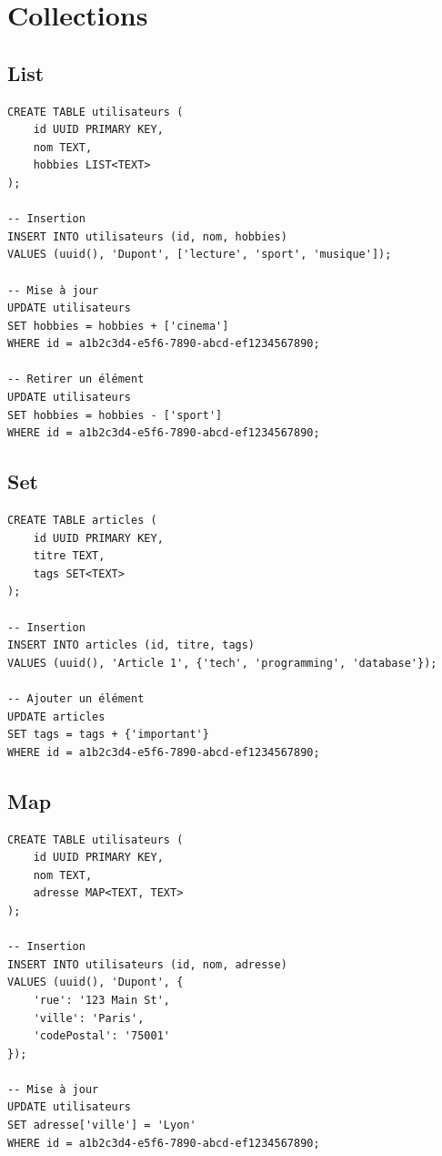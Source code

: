 \documentclass[11pt,a4paper]{article}
\begin{document}
\newpage

\section{Collections}

\subsection{List}

\begin{lstlisting}
CREATE TABLE utilisateurs (
    id UUID PRIMARY KEY,
    nom TEXT,
    hobbies LIST<TEXT>
);

-- Insertion
INSERT INTO utilisateurs (id, nom, hobbies)
VALUES (uuid(), 'Dupont', ['lecture', 'sport', 'musique']);

-- Mise à jour
UPDATE utilisateurs
SET hobbies = hobbies + ['cinema']
WHERE id = a1b2c3d4-e5f6-7890-abcd-ef1234567890;

-- Retirer un élément
UPDATE utilisateurs
SET hobbies = hobbies - ['sport']
WHERE id = a1b2c3d4-e5f6-7890-abcd-ef1234567890;
\end{lstlisting}

\subsection{Set}

\begin{lstlisting}
CREATE TABLE articles (
    id UUID PRIMARY KEY,
    titre TEXT,
    tags SET<TEXT>
);

-- Insertion
INSERT INTO articles (id, titre, tags)
VALUES (uuid(), 'Article 1', {'tech', 'programming', 'database'});

-- Ajouter un élément
UPDATE articles
SET tags = tags + {'important'}
WHERE id = a1b2c3d4-e5f6-7890-abcd-ef1234567890;
\end{lstlisting}

\subsection{Map}

\begin{lstlisting}
CREATE TABLE utilisateurs (
    id UUID PRIMARY KEY,
    nom TEXT,
    adresse MAP<TEXT, TEXT>
);

-- Insertion
INSERT INTO utilisateurs (id, nom, adresse)
VALUES (uuid(), 'Dupont', {
    'rue': '123 Main St',
    'ville': 'Paris',
    'codePostal': '75001'
});

-- Mise à jour
UPDATE utilisateurs
SET adresse['ville'] = 'Lyon'
WHERE id = a1b2c3d4-e5f6-7890-abcd-ef1234567890;
\end{lstlisting}
\end{document}
